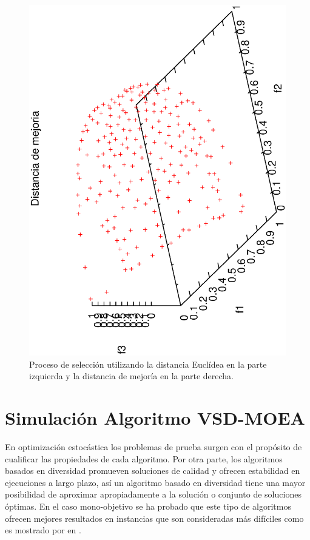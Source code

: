 \begin{figure}[H]
\includegraphics[scale=0.23, angle=-90,origin=c]
{Figures_Chapter3/mejoria.eps}
\caption{Proceso de selección utilizando la distancia Euclídea en la parte izquierda y la distancia de mejoría en la parte derecha.}
\label{fig:Distancia_Mejoria}
\end{figure}

\section{Simulación Algoritmo VSD-MOEA}

En optimización estocástica los problemas de prueba surgen con el propósito de cualificar las propiedades de cada algoritmo.
%
Por otra parte, los algoritmos basados en diversidad promueven soluciones de calidad y ofrecen estabilidad en ejecuciones a largo plazo, así un algoritmo basado en diversidad tiene una mayor posibilidad de aproximar apropiadamente a la solución o conjunto de soluciones óptimas.
%
En el caso mono-objetivo se ha probado que este tipo de algoritmos ofrecen mejores resultados en instancias que son consideradas más difíciles como es mostrado por \citeauthor{Joel:Dynamic_FAP} en .
%

